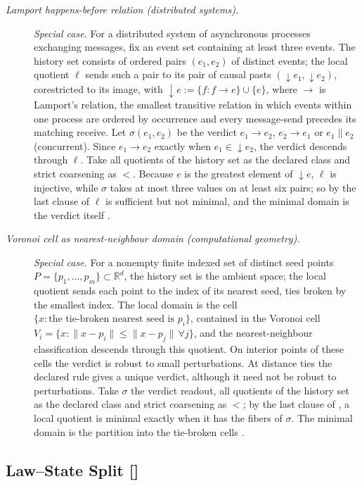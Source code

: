 \begin{description}
\item[\emph{Lamport happens-before relation
(distributed systems).}] \textit{Special case.}
For a distributed system of asynchronous processes exchanging
messages, fix an event set containing at least three events. The history set consists of ordered pairs \((e_1,e_2)\) of distinct events; the local quotient \(\ell\) sends such a pair to its pair of causal pasts \((\downarrow e_1,\downarrow e_2)\), corestricted to its image, with \(\downarrow e:=\{f:f\to e\}\cup\{e\}\), where \(\to\) is Lamport's relation, the smallest transitive relation in which events within one process are ordered by occurrence and every message-send precedes its matching receive. Let \(\sigma(e_1,e_2)\) be the verdict \(e_1\to e_2\), \(e_2\to e_1\) or \(e_1\parallel e_2\) (concurrent). Since \(e_1\to e_2\) exactly when \(e_1\in\downarrow e_2\), the verdict descends through \(\ell\). Take all quotients of the history set as the declared class and strict coarsening as \(<\). Because \(e\) is the greatest element of \(\downarrow e\), \(\ell\) is injective, while \(\sigma\) takes at most three values on at least six pairs; so by the last clause of  \(\ell\) is sufficient but not minimal, and the minimal domain is the verdict itself \citep{Lamport1978HappensBefore}.

\item[\emph{Voronoi cell as nearest-neighbour
domain (computational geometry).}] \textit{Special case.}
For a nonempty finite indexed set of distinct seed points
\(P=\{p_1,\ldots,p_m\}\subset\mathbb R^d\), the history set is the ambient
space; the local quotient sends each point to the
index of its nearest seed, ties broken by the smallest index.  The local
domain is the cell \(\{x:\text{the tie-broken nearest seed is }p_i\}\),
contained in the Voronoi cell
\(V_i=\{x:\|x-p_i\|\le\|x-p_j\|\,\forall j\}\), and
the nearest-neighbour classification descends
through this quotient.  On interior points of these cells the verdict is
robust to small perturbations. At distance ties the declared rule gives a
unique verdict, although it need not be robust to perturbations.
Take \(\sigma\) the verdict readout, all quotients of the history set as the declared class and strict coarsening as \(<\); by the last clause of , a local quotient is minimal exactly when it has the fibers of \(\sigma\). The minimal domain is the partition into the tie-broken cells
\citep{Voronoi1908Nouvelles}.
\end{description}
\endgroup

\subsection{Law--State Split [\texorpdfstring{}{F46}]}\label{sec:self-reference-limits:law-state-split}

